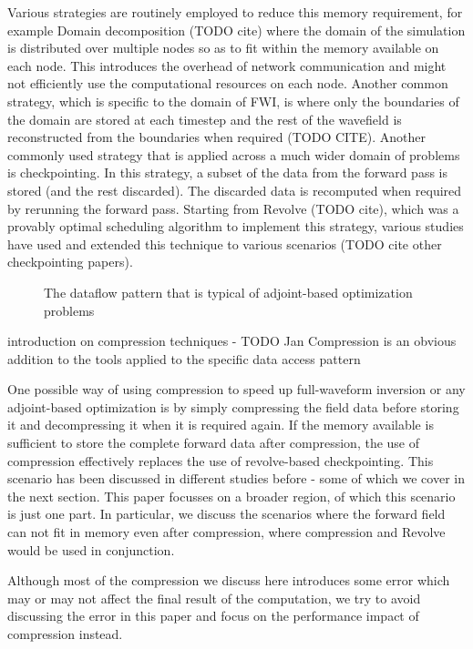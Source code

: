 \documentclass[conference]{IEEEtran}
\begin{document}
Various strategies are routinely employed to reduce this memory requirement, for example 
Domain decomposition (TODO cite) where the domain of the simulation is distributed over
multiple nodes so as to fit within the memory available on each node. This introduces the overhead
of network communication and might not efficiently use the computational resources on each node.
Another common strategy, which is specific to the domain of FWI, is where only the boundaries of
the domain are stored at each timestep and the rest of the wavefield is reconstructed from the
boundaries when required (TODO CITE). Another commonly used strategy that is applied across
a much wider domain of problems is checkpointing. In this strategy, a subset of the data from the
forward pass is stored (and the rest discarded). The discarded data is recomputed when required
by rerunning the forward pass. Starting from Revolve (TODO cite), which was a provably optimal
scheduling algorithm to implement this strategy, various studies have used and extended this
technique to various scenarios (TODO cite other checkpointing papers). 

\begin{figure}
\begin{center}

\end{center}
\caption{The dataflow pattern that is typical of adjoint-based optimization problems}
\label{fig:dataflow}
\end{figure}

introduction on compression techniques - TODO Jan
Compression is an obvious addition to the tools applied to the specific data access pattern 


One possible way of using compression to speed up full-waveform inversion or any adjoint-based
optimization is by simply compressing the field data before storing it and decompressing it when it
is required again. If the memory available is sufficient to store the complete forward data after
compression, the use of compression effectively replaces the use of revolve-based checkpointing.
This scenario has been discussed in different studies before - some of which we cover in the next
section. This paper focusses on a broader region, of which this scenario is just one part. In particular,
we discuss the scenarios where the forward field can not fit in memory even after compression, where
compression and Revolve would be used in conjunction. 

Although most of the compression we discuss here introduces some error which may or may not affect
the final result of the computation, we try to avoid discussing the error in this paper and focus on the 
performance impact of compression instead.
\end{document}
